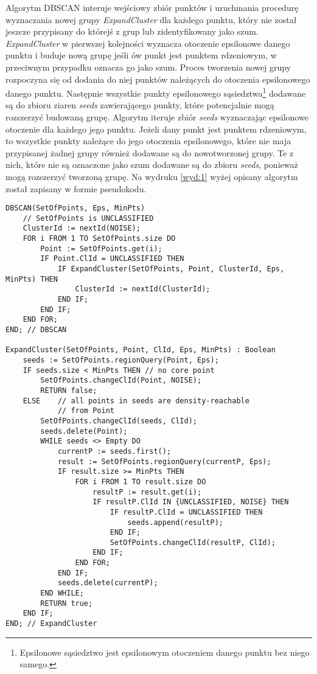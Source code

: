 Algorytm DBSCAN interuje wejściowy zbiór punktów i uruchmania procedurę wyznaczania nowej grupy \emph{ExpandCluster} dla każdego punktu, który nie został jeszcze przypisany do którejś z grup lub zidentyfikowany jako szum. \emph{ExpandCluster} w pierwszej kolejności wyznacza otoczenie epsilonowe danego punktu i buduje nową grupę jeśli ów punkt jest punktem rdzeniowym, w przeciwnym przypadku oznacza go jako szum. Proces tworzenia nowej grupy rozpoczyna się od dodania do niej punktów należących do otoczenia epsilonowego danego punktu. Następnie wszystkie punkty epsilonowego sąsiedztwa\footnote{Epsilonowe sąsiedztwo jest epsilonowym otoczeniem danego punktu bez niego samego.} dodawane są do zbioru ziaren \emph{seeds} zawierającego punkty, które potencjalnie mogą rozszerzyć budowaną grupę. Algorytm iteruje zbiór \emph{seeds} wyznaczając epsilonowe otoczenie dla każdego jego punktu. Jeżeli dany punkt jest punktem rdzeniowym, to wszystkie punkty należące do jego otoczenia epsilonowego, które nie maja przypisanej żadnej grupy również dodawane są do nowotworzonej grupy. Te z nich, które nie są oznaczone jako szum dodawane są do zbioru \emph{seeds}, ponieważ mogą rozszerzyć tworzoną grupę. Na wydruku \ref{wyd:1} wyżej opisany algorytm został zapisany w formie pseudokodu.

\begin{lstlisting}[style=outcode,caption=DBSCAN pseudokod]
DBSCAN(SetOfPoints, Eps, MinPts)
	// SetOfPoints is UNCLASSIFIED
	ClusterId := nextId(NOISE);
	FOR i FROM 1 TO SetOfPoints.size DO
		Point := SetOfPoints.get(i);
		IF Point.ClId = UNCLASSIFIED THEN
			IF ExpandCluster(SetOfPoints, Point, ClusterId, Eps, MinPts) THEN
				ClusterId := nextId(ClusterId);
			END IF;
		END IF;
	END FOR;
END; // DBSCAN

ExpandCluster(SetOfPoints, Point, ClId, Eps, MinPts) : Boolean
	seeds := SetOfPoints.regionQuery(Point, Eps);
	IF seeds.size < MinPts THEN	// no core point
		SetOfPoints.changeClId(Point, NOISE);
		RETURN false;
	ELSE	// all points in seeds are density-reachable
			// from Point
		SetOfPoints.changeClId(seeds, ClId);
		seeds.delete(Point);
		WHILE seeds <> Empty DO
			currentP := seeds.first();
			result := SetOfPoints.regionQuery(currentP, Eps);
			IF result.size >= MinPts THEN
				FOR i FROM 1 TO result.size DO
					resultP := result.get(i);
					IF resultP.ClId IN {UNCLASSIFIED, NOISE} THEN
						IF resultP.ClId = UNCLASSIFIED THEN
							seeds.append(resultP);
						END IF;
						SetOfPoints.changeClId(resultP, ClId);
					END IF;
				END FOR;
			END IF;
			seeds.delete(currentP);
		END WHILE;
		RETURN true;
	END IF;
END; // ExpandCluster
\end{lstlisting}\label{wyd:1}

